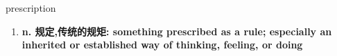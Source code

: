 
\begin{frame}
{\huge prescription}
\begin{center}
\begin{enumerate}\Large
  \item \textbf{n. 规定,传统的规矩: something prescribed as a rule; especially an inherited or established way of thinking, feeling, or doing}
\end{enumerate}
\end{center}
\end{frame}
